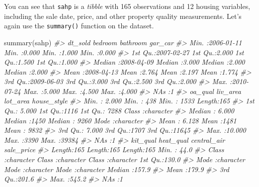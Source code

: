 \documentclass[
]{book}
\newenvironment{Shaded}{\begin{snugshade}}{\end{snugshade}}
\newcommand{\CommentTok}[1]{\textcolor[rgb]{0.56,0.35,0.01}{\textit{#1}}}
\newcommand{\FunctionTok}[1]{\textcolor[rgb]{0.00,0.00,0.00}{#1}}
\newcommand{\NormalTok}[1]{#1}
\begin{document}
You can see that \texttt{sahp} is a \emph{tibble} with 165 observations and 12 housing variables, including the sale date, price, and other property quality measurements. Let's again use the \texttt{summary()} function on the dataset.

\begin{Shaded}
\begin{Highlighting}[]
\FunctionTok{summary}\NormalTok{(sahp)}
\CommentTok{\#\textgreater{}     dt\_sold              bedroom         bathroom        gar\_car     }
\CommentTok{\#\textgreater{}  Min.   :2006{-}01{-}11   Min.   :0.000   Min.   :1.000   Min.   :0.000  }
\CommentTok{\#\textgreater{}  1st Qu.:2007{-}02{-}27   1st Qu.:2.000   1st Qu.:1.500   1st Qu.:1.000  }
\CommentTok{\#\textgreater{}  Median :2008{-}04{-}09   Median :3.000   Median :2.000   Median :2.000  }
\CommentTok{\#\textgreater{}  Mean   :2008{-}04{-}13   Mean   :2.764   Mean   :2.197   Mean   :1.774  }
\CommentTok{\#\textgreater{}  3rd Qu.:2009{-}06{-}03   3rd Qu.:3.000   3rd Qu.:2.500   3rd Qu.:2.000  }
\CommentTok{\#\textgreater{}  Max.   :2010{-}07{-}24   Max.   :5.000   Max.   :4.500   Max.   :4.000  }
\CommentTok{\#\textgreater{}                                                       NA\textquotesingle{}s   :1      }
\CommentTok{\#\textgreater{}     oa\_qual          liv\_area       lot\_area     house\_style       }
\CommentTok{\#\textgreater{}  Min.   : 2.000   Min.   : 438   Min.   : 1533   Length:165        }
\CommentTok{\#\textgreater{}  1st Qu.: 5.000   1st Qu.:1116   1st Qu.: 7288   Class :character  }
\CommentTok{\#\textgreater{}  Median : 6.000   Median :1450   Median : 9260   Mode  :character  }
\CommentTok{\#\textgreater{}  Mean   : 6.128   Mean   :1481   Mean   : 9832                     }
\CommentTok{\#\textgreater{}  3rd Qu.: 7.000   3rd Qu.:1707   3rd Qu.:11645                     }
\CommentTok{\#\textgreater{}  Max.   :10.000   Max.   :3390   Max.   :39384                     }
\CommentTok{\#\textgreater{}  NA\textquotesingle{}s   :1                                                         }
\CommentTok{\#\textgreater{}    kit\_qual          heat\_qual         central\_air          sale\_price   }
\CommentTok{\#\textgreater{}  Length:165         Length:165         Length:165         Min.   : 44.0  }
\CommentTok{\#\textgreater{}  Class :character   Class :character   Class :character   1st Qu.:130.0  }
\CommentTok{\#\textgreater{}  Mode  :character   Mode  :character   Mode  :character   Median :157.9  }
\CommentTok{\#\textgreater{}                                                           Mean   :179.9  }
\CommentTok{\#\textgreater{}                                                           3rd Qu.:201.6  }
\CommentTok{\#\textgreater{}                                                           Max.   :545.2  }
\CommentTok{\#\textgreater{}                                                           NA\textquotesingle{}s   :1}
\end{Highlighting}
\end{Shaded}
\end{document}
